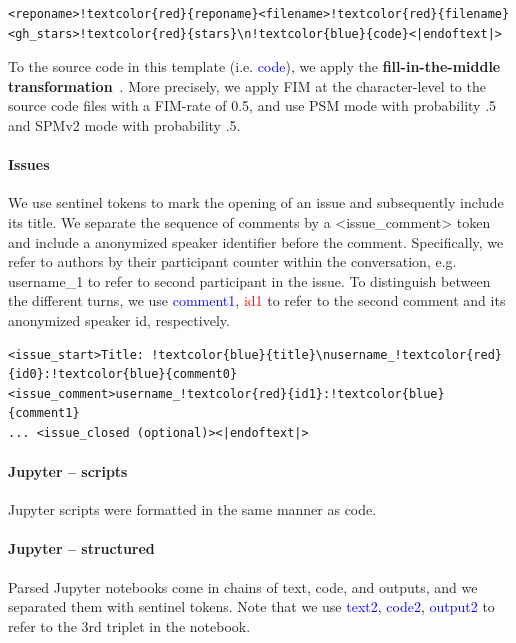 \begin{Verbatim}[commandchars=!\{\}]
<reponame>!textcolor{red}{reponame}<filename>!textcolor{red}{filename}<gh_stars>!textcolor{red}{stars}\n!textcolor{blue}{code}<|endoftext|>
\end{Verbatim}

To the source code in this template (i.e. \textcolor{blue}{code}), we apply the \textbf{fill-in-the-middle transformation}~\citep[FIM;][]{bavarian2022fim}. More precisely, we apply FIM at the character-level to the source code files with a FIM-rate of 0.5, and use PSM mode with probability .5 and SPMv2 mode with probability .5. 

\paragraph{Issues} We use sentinel tokens to mark the opening of an issue and subsequently include its title. We separate the sequence of comments by a <issue\_comment> token and include a anonymized speaker identifier before the comment. Specifically, we refer to authors by their participant counter within the conversation, e.g.  username\_1 to refer to second participant in the issue. To distinguish between the different turns, we use \textcolor{blue}{comment1}, \textcolor{red}{id1} to refer to the second comment and its anonymized speaker id, respectively.

\begin{Verbatim}[commandchars=!\{\}]
<issue_start>Title: !textcolor{blue}{title}\nusername_!textcolor{red}{id0}:!textcolor{blue}{comment0}<issue_comment>username_!textcolor{red}{id1}:!textcolor{blue}{comment1}
... <issue_closed (optional)><|endoftext|>
\end{Verbatim}

\paragraph{Jupyter -- scripts}

Jupyter scripts were formatted in the same manner as code.

\paragraph{Jupyter -- structured} Parsed Jupyter notebooks come in chains of text, code, and outputs, and we separated them with sentinel tokens. Note that we use \textcolor{blue}{text2}, \textcolor{blue}{code2}, \textcolor{blue}{output2} to refer to the 3rd triplet in the notebook.

